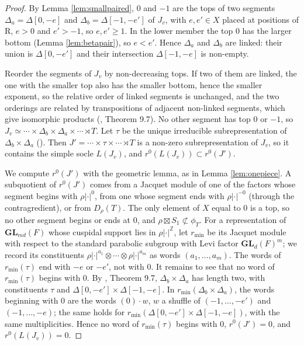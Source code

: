 \documentclass[a4paper,12pt,leqno]{amsart}
\theoremstyle{plain}
\theoremstyle{definition}
\begin{document}
\begin{proof}
By Lemma \ref{lem:smallpaired}, $0$ and $-1$ are the tops of two segments $\Delta_a=\Delta[0,-e]$ and
$\Delta_b=\Delta[-1,-e']$ of $J_v$, with $e,e'\in X$ placed at positions of R, $e>0$ and $e'>-1$, so
$e,e'\geq1$. In the lower member the top $0$ has the larger bottom (Lemma \ref{lem:betapair}), so
$e<e'$. Hence $\Delta_a$ and $\Delta_b$ are linked: their union is $\Delta[0,-e']$ and their intersection
$\Delta[-1,-e]$ is non-empty.

Reorder the segments of $J_v$ by non-decreasing tops. If two of them are linked, the one with the
smaller top also has the smaller bottom, hence the smaller exponent, so the relative order of linked
segments is unchanged, and the two orderings are related by transpositions of adjacent non-linked
segments, which give isomorphic products (\cite{Zel80}, Theorem 9.7). No other segment has top $0$ or
$-1$, so $J_v\simeq\cdots\times\Delta_b\times\Delta_a\times\cdots\rtimes T$. Let $\tau$ be the unique irreducible
subrepresentation of $\Delta_b\times\Delta_a$ (\cite{Zel80}). Then $J'=\cdots\times\tau\times\cdots
\rtimes T$ is a non-zero subrepresentation of $J_v$, so it contains the simple socle $L(J_v)$, and
$r^0(L(J_v))\subset r^0(J')$.

We compute $r^0(J')$ with the geometric lemma, as in Lemma \ref{lem:onepiece}. A subquotient of
$r^0(J')$ comes from a Jacquet module of one of the factors whose segment begins with $\rho|\cdot|^0$, from
one whose segment ends with $\rho|\cdot|^{-0}$ (through the contragredient), or from
$D_{\rho}(T)$. The only element of $X$ equal to $0$ is a top, so no other segment begins or ends at
$0$, and $\rho\boxtimes S_1\not\subset\phi_T$. For a representation of $\mathbf{GL}_{md}(F)$ whose
cuspidal support lies in $\rho|\cdot|^{\mathbb Z}$, let $r_{\min}$ be its Jacquet module with respect to the
standard parabolic subgroup with Levi factor $\mathbf{GL}_d(F)^m$; we record its constituents
$\rho|\cdot|^{a_1}\otimes\cdots\otimes\rho|\cdot|^{a_m}$ as words $(a_1,\ldots,a_m)$. The words of $r_{\min}(\tau)$ end with $-e$ or $-e'$,
not with $0$. It remains to see that no word of $r_{\min}(\tau)$ begins with $0$. By \cite{Zel80},
Theorem 9.7, $\Delta_b\times\Delta_a$ has length two, with constituents $\tau$ and
$\Delta[0,-e']\times\Delta[-1,-e]$. In $r_{\min}(\Delta_b\times\Delta_a)$, the words beginning with $0$
are the words $(0)\cdot w$, $w$ a shuffle of $(-1,\ldots,-e')$ and $(-1,\ldots,-e)$; the same holds for
$r_{\min}(\Delta[0,-e']\times\Delta[-1,-e])$, with the same multiplicities. Hence no word of
$r_{\min}(\tau)$ begins with $0$, $r^0(J')=0$, and $r^0(L(J_v))=0$.
\end{proof}
\end{document}
